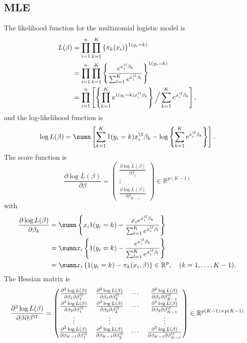 \subsection{MLE}
The likelihood function for the multinomial logistic model is
\begin{align*}
L(\beta) & =\prod_{i=1}^{n}\prod_{k=1}^{K}\left\{ \pi_{k}(x_{i})\right\} ^{1(y_{i}=k)}\\
 & =\prod_{i=1}^{n}\prod_{k=1}^{K}\left\{ \frac{e^{x_{i}^{\T}\beta_{k}}}{\sum_{ l =1}^{K}e^{x_{i}^{\T}\beta_{ l }}}\right\} ^{1(y_{i}=k)}\\
 & =\prod_{i=1}^{n}
\left[  
 \left\{ \prod_{k=1}^{K}e^{1(y_{i}=k)x_{i}^{\T}\beta_{k}}\right\}  \Big/\sum_{k=1}^{K}e^{x_{i}^{\T}\beta_{k}}
 \right],
\end{align*}
and
the log-likelihood function is
\[
\log L(\beta)=\sumn
\left[ 
\sum_{k=1}^{K} 1(y_{i}=k)x_{i}^{\T}\beta_{k}-\log\left\{ \sum_{k=1}^{K}e^{x_{i}^{\T}\beta_{k}}\right\} \right].
\]
The score function is 
$$
\frac{\partial\log L(\beta)}{\partial\beta} = \begin{pmatrix}
\frac{\partial\log L(\beta)}{\partial\beta_{1}}\\
\vdots\\
\frac{\partial\log L(\beta)}{\partial\beta_{K-1}} 
\end{pmatrix}
\in \mathbb{R}^{p(K-1)}
$$
with 
\begin{align*}
\frac{\partial\log L(\beta)}{\partial\beta_{k}} & =\sumn\left\{ x_{i}1(y_{i}=k)-\frac{x_{i}e^{x_{i}^{\T}\beta_{k}}}{\sum_{ l =1}^{K}e^{x_{i}^{\T}\beta_{ l }}}\right\} \\
 & =\sumn x_{i}\left\{ 1(y_{i}=k)-\frac{e^{x_{i}^{\T}\beta_{k}}}{\sum_{ l =1}^{K}e^{x_{i}^{\T}\beta_{ l }}}\right\} \\
 & =\sumn x_{i}\left\{ 1(y_{i}=k)-\pi_{k}(x_{i},\beta)\right\}  \in \mathbb{R}^{p}  ,\quad(k=1,\ldots,K-1).
\end{align*}
The Hessian matrix is 
\begin{eqnarray}
\frac{\partial^{2}\log L(\beta)}{\partial\beta \partial\beta^{\T}}
=\begin{pmatrix}
\frac{\partial^{2}\log L(\beta)}{\partial\beta_{1}\partial\beta_{1}^{\T}}  & \frac{\partial^{2}\log L(\beta)}{\partial\beta_{1}\partial\beta_{2}^{\T}}  & \cdots & \frac{\partial^{2}\log L(\beta)}{\partial\beta_{1}\partial\beta_{K-1}^{\T}}  \\
\frac{\partial^{2}\log L(\beta)}{\partial\beta_{2}\partial\beta_{1}^{\T}}  & \frac{\partial^{2}\log L(\beta)}{\partial\beta_{2}\partial\beta_{2}^{\T}}  & \cdots & \frac{\partial^{2}\log L(\beta)}{\partial\beta_{2}\partial\beta_{K-1}^{\T}}  \\
\vdots &\vdots  &&\vdots \\
\frac{\partial^{2}\log L(\beta)}{\partial\beta_{K-1}\partial\beta_{1}^{\T}} & \frac{\partial^{2}\log L(\beta)}{\partial\beta_{K-1}\partial\beta_{2}^{\T}}  & \cdots & \frac{\partial^{2}\log L(\beta)}{\partial\beta_{K-1}\partial\beta_{K-1}^{\T}} 
\end{pmatrix}  
\in  \mathbb{R}^{p(K-1)\times p(K-1)}  \label{eq::hessian-logit-categorical}
\end{eqnarray}
